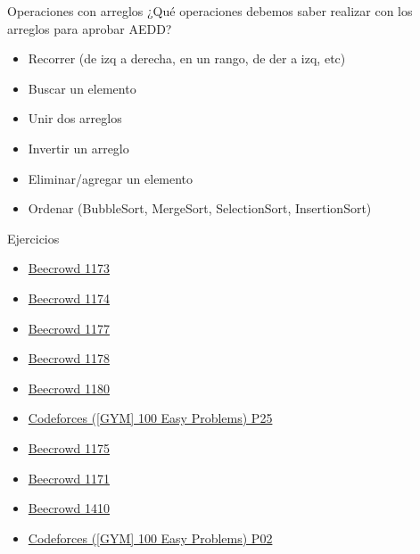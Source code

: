 \documentclass[12pt]{beamer}
\begin{document}
\begin{frame}{Operaciones con arreglos}
    ¿Qué operaciones debemos saber realizar con los arreglos para aprobar AEDD?
    \begin{itemize}
        \item Recorrer (de izq a derecha, en un rango, de der a izq, etc)
        \item Buscar un elemento
        \item Unir dos arreglos
        \item Invertir un arreglo
        \item Eliminar/agregar un elemento
        \item Ordenar (BubbleSort, MergeSort, SelectionSort, InsertionSort)
    \end{itemize}
\end{frame}

\begin{frame}{Ejercicios}
    \begin{itemize}
        \item \href{https://judge.beecrowd.com/es/problems/view/1173}{Beecrowd 1173}
        \item \href{https://judge.beecrowd.com/es/problems/view/1174}{Beecrowd 1174}
        \item \href{https://judge.beecrowd.com/es/problems/view/1177}{Beecrowd 1177}
        \item \href{https://judge.beecrowd.com/es/problems/view/1178}{Beecrowd 1178}
        \item \href{https://judge.beecrowd.com/es/problems/view/1180}{Beecrowd 1180}
        \item \href{https://codeforces.com/group/yg7WhsFsAp/contest/355494/problem/P25}{Codeforces ([GYM] 100 Easy Problems) P25}
        \item \href{https://judge.beecrowd.com/es/problems/view/1175}{Beecrowd 1175}
        \item \href{https://judge.beecrowd.com/es/problems/view/1171}{Beecrowd 1171}
        \item \href{https://judge.beecrowd.com/es/problems/view/1410}{Beecrowd 1410}
        \item \href{https://codeforces.com/group/yg7WhsFsAp/contest355490/problem/P02}{Codeforces ([GYM] 100 Easy Problems) P02}
    \end{itemize}
\end{frame}
\end{document}
